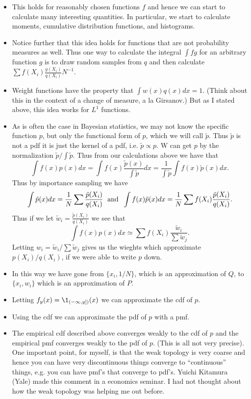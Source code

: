 \documentclass{article}
\begin{document}
\begin{itemize}
\begin{itemize}
\item This holds for reasonably chosen functions $f$ and hence we can start to calculate many interesting quantities.  In particular, we start to calculate moments, cumulative distribution functions, and histograms.
\item Notice further that this idea holds for functions that are not probability measures as well.  Thus one way to calculate the integral $\int f g$ for an arbitrary function $g$ is to draw random samples from $q$ and then calculate $\sum f(X_i) \frac{g(X_i)}{q(X_i)} N^{-1}$.
\item Weight functions have the property that $\int w(x) q(x) dx = 1$.  (Think about this in the context of a change of measure, a la Girsanov.)  But as I stated above, this idea works for $L^1$ functions.
\item As is often the case in Bayesian statistics, we may not know the specific function $p$, but only the functional form of $p$, which we will call $\tilde p$.  Thus $\tilde p$ is not a pdf it is just the kernel of a pdf, i.e. $\tilde p \propto p$.  W can get $p$ by the normalization $\tilde p / \int \tilde p$.  Thus from our calculations above we have that
\[
\int f(x) p(x) dx = \int f(x) \frac{\tilde p(x)}{\int \tilde p} dx = \frac{1}{\int \tilde p} \int f(x) \tilde p(x) dx.
\]
Thus by importance sampling we have
\[
\int \tilde p(x) dx = \frac{1}{N} \sum \frac{\tilde p(X_i)}{q(X_i)}
\; \textmd{ and } \;
\int f(x) \tilde p(x) dx = \frac{1}{N} \sum f(X_i) \frac{\tilde p(X_i)}{q(X_i)}.
\]
Thus if we let $\tilde w_i = \frac{\tilde p(X_i)}{q(X_i)}$ we see that 
\[
\int f(x) p(x) dx \simeq \sum f(X_i) \frac{\tilde w_i}{\sum \tilde w_j}.
\]
Letting $w_i = \tilde w_i / \sum \tilde w_j$ gives us the wieghts which approximate $p(X_i)/q(X_i)$, if we were able to write $p$ down.
\item In this way we have gone from $\{x_i, 1/N\}$, which is an approximation of $Q$, to $\{x_i, w_i\}$ which is an approximation of $P$.
\item Letting $f_y(x) = \1_{(-\infty, y])}(x)$ we can approximate the cdf of $p$.
\item Using the cdf we can approximate the pdf of $p$ with a pmf.
\item The empirical cdf described above converges weakly to the cdf of $p$ and the empirical pmf converges weakly to the pdf of $p$.  (This is all not very precise).  One important point, for myself, is that the weak topology is very coarse and hence you can have very discontinuous things converge to ``continuous'' things, e.g. you can have pmf's that converge to pdf's.  Yuichi Kitamura (Yale) made this comment in a economics seminar.  I had not thought about how the weak topology was helping me out before.

\end{itemize}
\end{itemize}
\end{document}
